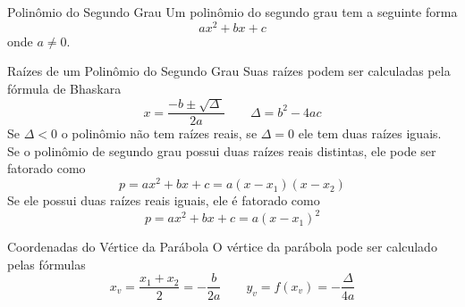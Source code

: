 \begin{teoria}{Polinômio do Segundo Grau}
    Um polinômio do segundo grau tem a seguinte forma
    \[ ax^2 + bx + c \]
    onde $a\neq 0$. 
\end{teoria}

\begin{teoria}{Raízes de um Polinômio do Segundo Grau}
    Suas raízes podem ser calculadas pela fórmula de Bhaskara
    \[ x = \frac{-b\pm\sqrt{\Delta\,}}{2a} \qquad \Delta = b^2 -4ac \]
    Se $\Delta < 0$ o polinômio não tem raízes reais, se $\Delta=0$ ele tem duas raízes iguais.
    \\
    
    Se o polinômio de segundo grau possui duas raízes reais distintas, ele pode ser fatorado como 
    \[ p = ax^2 + bx + c = a(x-x_1)(x-x_2)\]
    Se ele possui duas raízes reais iguais, ele é fatorado como 
    \[ p = ax^2 + bx + c = a(x-x_1)^2\]
\end{teoria}

\begin{teoria}{Coordenadas do Vértice da Parábola}
    O vértice da parábola pode ser calculado pelas fórmulas
    \[x_v = \frac{x_1+x_2}{2} = -\frac{b}{2a} \qquad y_v = f(x_v) = -\frac{\Delta}{4a}\]
\end{teoria}

